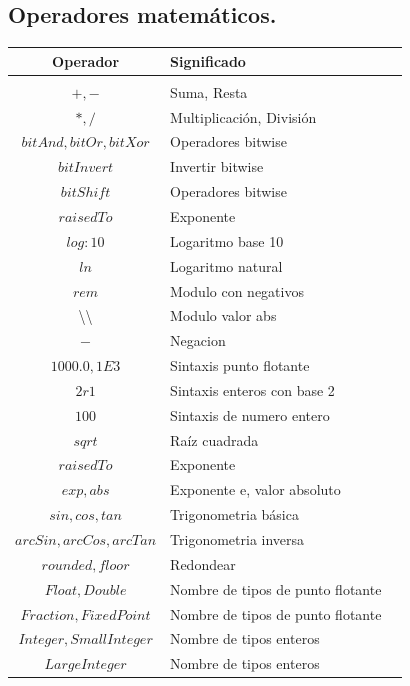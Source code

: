 \documentclass[10pt,journal,compsoc]{IEEEtran}
\begin{document}
\subsection{Operadores matem\'aticos.}
\begin{tabular}{c p{4cm} p{1cm}}
	Operador & Significado\\
	\hline\\
	$+ , - $ & Suma, Resta \\
	$* , /$ & Multiplicaci\'on,  Divisi\'on\\
	$bitAnd , bitOr , bitXor$ & Operadores bitwise\\
	$bitInvert$ & Invertir bitwise\\
	$bitShift$ & Operadores bitwise \\
	$raisedTo$ & Exponente\\
	$log: 10$ & Logaritmo base 10\\
	$ln$ & Logaritmo natural\\
	$rem$ & Modulo con negativos\\
	\textbackslash{}\textbackslash{} & Modulo valor abs\\
	$-$ & Negacion\\
	$1000.0, 1E3$ & Sintaxis punto flotante\\
	$2r1$ & Sintaxis enteros con base 2\\
	$100$ & Sintaxis de numero entero\\
	$sqrt $ & Ra\'iz cuadrada\\
	$raisedTo$ & Exponente\\
	$exp, abs$ & Exponente e, valor absoluto\\
	$sin, cos, tan$ & Trigonometria b\'asica\\
	$arcSin, arcCos, arcTan$ & Trigonometria inversa\\
	$rounded, floor$ & Redondear\\
	$Float, Double$ & Nombre de tipos de punto flotante\\
	$Fraction, FixedPoint$ & Nombre de tipos de punto flotante\\
	$Integer, SmallInteger$ & Nombre de tipos enteros\\
	$LargeInteger$ & Nombre de tipos enteros\\	
	\hline
\end{tabular}
\end{document}

